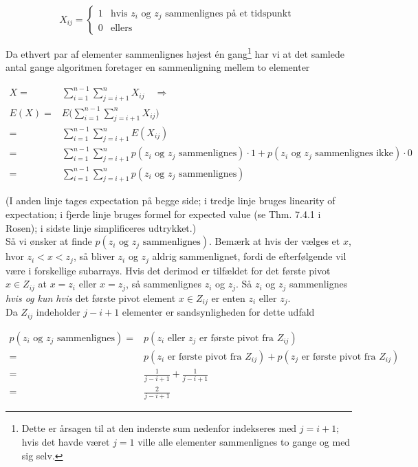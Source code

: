 \documentclass[12pt]{article}
\begin{document}
\[ X_{ij} = \left\{ \begin{array}{ll}
        1 & \mbox{hvis $z_i$ og $z_j$ sammenlignes på et tidspunkt }\\
        0 & \mbox{ellers}\end{array} \right. \] 

Da ethvert par af elementer sammenlignes højest én gang\footnote{Dette er årsagen til at den inderste sum nedenfor indekseres med $j=i+1$; hvis det havde været $j=1$ ville alle elementer sammenlignes to gange og med sig selv.} har vi at det samlede antal gange algoritmen foretager en sammenligning mellem to elementer  

\begin{align*}
    X =& \sum_{i=1}^{n-1} \sum_{j=i+1}^n X_{ij} \quad \Rightarrow \\
    E(X) =& E\bigg(  \sum_{i=1}^{n-1} \sum_{j=i+1}^n X_{ij}\bigg) &&  \\
    =& \sum_{i=1}^{n-1} \sum_{j=i+1}^n E(X_{ij}) &&  \\
    =& \sum_{i=1}^{n-1} \sum_{j=i+1}^n p(z_i \text{ og } z_j \text{ sammenlignes}) \cdot 1 + p(z_i \text{ og } z_j \text{ sammenlignes ikke}) \cdot 0 \\
    =& \sum_{i=1}^{n-1} \sum_{j=i+1}^n p(z_i \text{ og } z_j \text{ sammenlignes}) 
\end{align*}

(I anden linje tages expectation på begge side; i tredje linje bruges linearity of expectation; i fjerde linje bruges formel for expected value (se Thm. 7.4.1 i Rosen); i sidste linje simplificeres udtrykket.) \\

Så vi ønsker at finde $p(z_i \text{ og } z_j \text{ sammenlignes})$. Bemærk at hvis der vælges et $x$, hvor $z_i < x < z_j$, så bliver $z_i$ og $z_j$ aldrig sammenlignet, fordi de efterfølgende vil være i forskellige subarrays. Hvis det derimod er tilfældet for det første pivot $x \in Z_{ij}$ at $x = z_i$ eller $x=z_j$, så sammenlignes $z_i$ og $z_j$. Så $z_i$ og $z_j$ sammenlignes \textit{hvis og kun hvis} det første pivot element $x \in Z_{ij}$ er enten $z_i$ eller $z_j$. \\

Da $Z_{ij}$ indeholder $j-i+1$ elementer er sandsynligheden for dette udfald  

\begin{align*}
    p(z_i \text{ og } z_j \text{ sammenlignes}) =& p(z_i \text{ eller } z_j \text{ er første pivot fra } Z_{ij}) \\
    =& p(z_i \text{ er første pivot fra } Z_{ij}) + p(z_j \text{ er første pivot fra } Z_{ij}) \\
    =& \frac{1}{j-i+1}+\frac{1}{j-i+1} \\
    =& \frac{2}{j-i+1}
\end{align*}
\end{document}

